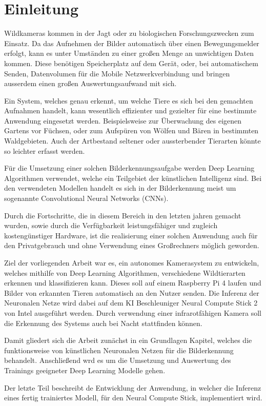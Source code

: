\chapter{Einleitung}\label{kap:einleitung}

Wildkameras kommen in der Jagt oder zu biologischen 
Forschungszwecken zum Einsatz.
Da das Aufnehmen der Bilder automatisch über einen 
Bewegungsmelder erfolgt, kann es unter Umständen zu 
einer großen Menge an unwichtigen Daten kommen.
Diese benötigen Speicherplatz auf dem Gerät, 
oder, bei automatischem Senden, Datenvolumen 
für die Mobile Netzwerkverbindung und bringen ausserdem einen 
großen Auswertungsaufwand mit sich.

Ein System, welches genau erkennt, um welche Tiere es
sich bei den gemachten Aufnahmen handelt, kann wesentlich 
effizienter und gezielter für eine bestimmte Anwendung 
eingesetzt werden.
Beispielsweise zur Überwachung des eigenen Gartens vor 
Füchsen, oder zum Aufspüren von Wölfen und Bären 
in bestimmten Waldgebieten.
Auch der Artbestand seltener oder aussterbender 
Tierarten könnte so leichter erfasst werden.

Für die Umsetzung einer solchen Bilderkennungsaufgabe 
werden Deep Learning Algorithmen verwendet, welche ein
Teilgebiet der künstlichen Intelligenz sind.
Bei den verwendeten Modellen handelt es sich in der Bilderkennung
meist um sogenannte Convolutional Neural Networks (CNNs).

Durch die Fortschritte, die in diesem Bereich in
den letzten jahren gemacht wurden, sowie durch 
die Verfügbarkeit leistungsfähiger und zugleich
kostengünstiger Hardware, ist die realisierung
einer solchen Anwendung auch für den Privatgebrauch
und ohne Verwendung eines Großrechners möglich geworden.


Ziel der vorliegenden Arbeit war es, ein autonomes Kamerasystem 
zu entwickeln, welches mithilfe von Deep Learning Algorithmen, 
verschiedene Wildtierarten erkennen und klassifizieren kann.
Dieses soll auf einem Raspberry Pi 4 laufen und 
Bilder von erkannten Tieren automatisch an den Nutzer 
senden.
Die Inferenz der Neuronalen Netze wird dabei
auf dem KI Beschleuniger Neural Compute Stick 2
von Intel ausgeführt werden. Durch verwendung einer 
infrarotfähigen Kamera soll die Erkennung des 
Systems auch bei Nacht stattfinden können.

Damit gliedert sich die Arbeit zunächst in ein
Grundlagen Kapitel, welches die funktionsweise 
von künstlichen Neuronalen Netzen für die
Bilderkennung behandelt.
Anschließend wrd es um die Umsetzung und Auswertung des 
Trainings geeigneter Deep Learning Modelle gehen.

Der letzte Teil beschreibt de Entwicklung der Anwendung, 
in welcher die Inferenz eines fertig trainiertes Modell, 
für den Neural Compute Stick, implementiert wird.